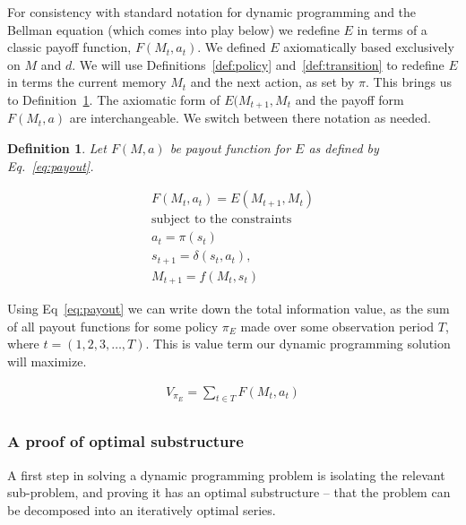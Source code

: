 \documentclass[9pt,twocolumn,twoside]{pnas-new}
\newtheorem{definition}{Definition}
\begin{document}
For consistency with standard notation for dynamic programming and the Bellman equation (which comes into play below) we redefine $E$ in terms of a classic payoff function, $F(M_{t}, a_t)$. We defined $E$ axiomatically based exclusively on $M$ and $d$. We will use Definitions~\ref{def:policy} and~\ref{def:transition} to redefine $E$ in terms the current memory $M_{t}$ and the next action, as set by $\pi$. This brings us to Definition~\ref{def:payoff}. The axiomatic form of $E(M_{t+1},M_{t}$ and the payoff form $F(M_t, a)$ are interchangeable. We switch between there notation as needed.

\begin{definition}
    \label{def:payoff}
    Let $F(M, a)$ be payout function for $E$ as defined by Eq.~\ref{eq:payout}.
\end{definition}

\begin{equation}
    \begin{split} \label{eq:payout}
    F(M_{t}, a_t) = E(M_{t+1}, M_{t})\\
    \text{subject to the constraints} \\
    a_{t} = \pi(s_t) \\
    s_{t+1} = \delta(s_{t}, a_t),\\ 
    M_{t+1} = f(M_{t}, s_{t})
    \end{split} 
\end{equation}

Using Eq~\ref{eq:payout} we can write down the total information value, as the sum of all payout functions for some policy $\pi_E$ made over some observation period $T$, where $t = (1,2,3,\ldots,T)$. This is value term our dynamic programming solution will maximize.

\begin{equation} \label{eq:V}
    \begin{split}
        V_{\pi_E} = \sum_{t \in T} F(M_{t}, a_t)\\
    \end{split}
\end{equation}

\subsubsection*{A proof of optimal substructure}
A first step in solving a dynamic programming problem is isolating the relevant sub-problem, and proving it has an optimal substructure -- that the problem can be decomposed into an iteratively optimal series. 
\end{document}
